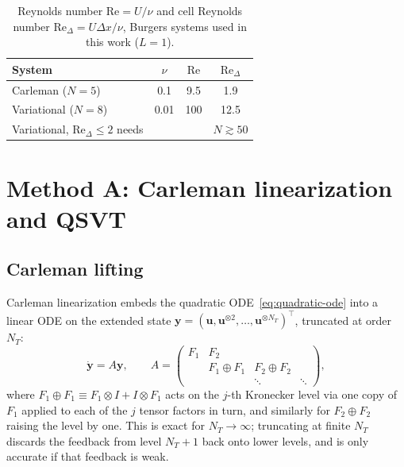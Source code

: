 \documentclass[aps,pra,twocolumn,notitlepage,superscriptaddress,floatfix,10pt]{revtex4-2}
\begin{document}
\begin{table}[t]
\caption{Reynolds number $\mathrm{Re}=U/\nu$ and cell Reynolds number
$\mathrm{Re}_\Delta=U\Delta x/\nu$, Burgers systems used in this work ($L=1$).}
\label{tab:reynolds}
\begin{ruledtabular}
\begin{tabular}{lccc}
System & $\nu$ & $\mathrm{Re}$ & $\mathrm{Re}_\Delta$ \\
\hline
Carleman ($N=5$) & 0.1 & 9.5 & 1.9 \\
Variational ($N=8$) & 0.01 & 100 & 12.5 \\
Variational, $\mathrm{Re}_\Delta\le2$ needs & & & $N\gtrsim50$ \\
\end{tabular}
\end{ruledtabular}
\end{table}

\section{Method A: Carleman linearization and QSVT}
\label{sec:carleman}

\subsection{Carleman lifting}
Carleman linearization embeds the quadratic ODE~\eqref{eq:quadratic-ode} into a linear ODE on the
extended state $\bm y=(\bm u,\bm u^{\otimes2},\dots,\bm u^{\otimes N_T})^{\!\top}$, truncated at order
$N_T$:
\begin{equation}
\dot{\bm y} = A\bm y, \qquad A=\begin{pmatrix}
F_1 & F_2 & & \\
& F_1\oplus F_1 & F_2\oplus F_2 & \\
& & \ddots & \ddots
\end{pmatrix},
\label{eq:carleman}
\end{equation}
where $F_1\oplus F_1\equiv F_1\otimes I+I\otimes F_1$ acts on the $j$-th Kronecker level via one copy
of $F_1$ applied to each of the $j$ tensor factors in turn, and similarly for $F_2\oplus F_2$ raising
the level by one. This is exact for $N_T\to\infty$; truncating at finite $N_T$ discards the feedback
from level $N_T+1$ back onto lower levels, and is only accurate if that feedback is weak.
\end{document}
